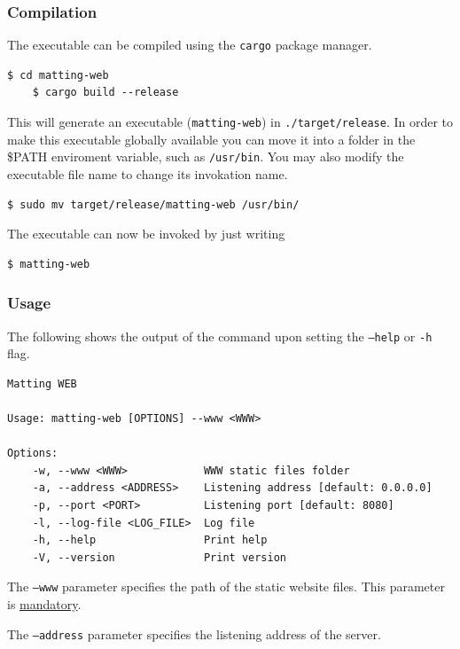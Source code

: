 \documentclass[a4paper]{article}
\begin{document}
\subsubsection{Compilation}

The executable can be compiled using the \texttt{cargo}
package manager.

\begin{lstlisting}[style=boxed]
    $ cd matting-web
    $ cargo build --release
\end{lstlisting}

This will generate an executable (\texttt{matting-web})
in \texttt{./target/release}.
In order to make this executable globally available
you can move it into a folder in the \textsc{\$PATH} enviroment
variable, such as \texttt{/usr/bin}.
You may also modify the executable file name to change its invokation
name.

\begin{lstlisting}[style=boxed]
    $ sudo mv target/release/matting-web /usr/bin/
\end{lstlisting}

The executable can now be invoked by just writing
\begin{lstlisting}[style=boxed]
    $ matting-web
\end{lstlisting}

\subsubsection{Usage}

The following shows the output of the command upon
setting the \texttt{--help} or \texttt{-h} flag.
\begin{lstlisting}[style=boxed]
Matting WEB

Usage: matting-web [OPTIONS] --www <WWW>

Options:
    -w, --www <WWW>            WWW static files folder
    -a, --address <ADDRESS>    Listening address [default: 0.0.0.0]
    -p, --port <PORT>          Listening port [default: 8080]
    -l, --log-file <LOG_FILE>  Log file
    -h, --help                 Print help
    -V, --version              Print version
\end{lstlisting}

The \texttt{--www} parameter specifies the path
of the static website files.
This parameter is \underline{mandatory}.

The \texttt{--address} parameter specifies the listening
address of the server.
\end{document}
